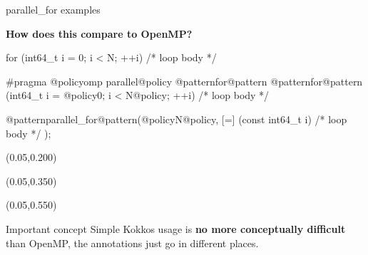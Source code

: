 \begin{frame}[fragile]{parallel\_for examples}

  \textbf{How does this compare to OpenMP?}

  \vspace{5pt}

  \begin{code}[linebackgroundcolor={
      },
      frame=single
    ]
for (int64_t i = 0; i < N; ++i) {
  /* loop body */
}
  \end{code}

  \begin{code}[linebackgroundcolor={
        \btLstHL<1->{3}{bodyColor}
      },
      frame=single
    ]
#pragma @policyomp parallel@policy @patternfor@pattern
@patternfor@pattern (int64_t i = @policy0; i < N@policy; ++i) {
  /* loop body */
}
  \end{code}

  \begin{code}[linebackgroundcolor={
        \btLstHL<1->{2}{bodyColor}
      },
      frame=single
    ]
@patternparallel_for@pattern(@policyN@policy, [=] (const int64_t i) {
  /* loop body */
});
  \end{code}


  \begin{textblock*}{0.5\textwidth}(0.05\textwidth,0.200\textheight)
  \end{textblock*}

  \begin{textblock*}{0.5\textwidth}(0.05\textwidth,0.350\textheight)
  \end{textblock*}

  \begin{textblock*}{0.5\textwidth}(0.05\textwidth,0.550\textheight)
  \end{textblock*}


  \begin{block}{Important concept}
    Simple Kokkos usage is \textbf{no more conceptually difficult} than OpenMP, the annotations just go in different places.
  \end{block}

\end{frame}


